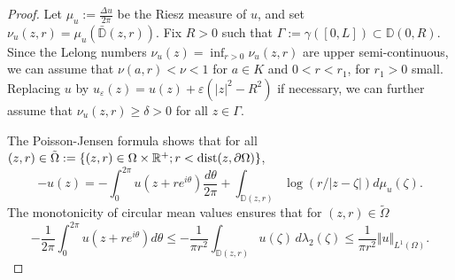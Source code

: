 \documentclass[a4paper,11pt,leqno,english]{smfart}
\theoremstyle{plain}
\theoremstyle{plain}
\numberwithin{equation}{section} %
\numberwithin{figure}{section} %
\theoremstyle{plain}
\theoremstyle{plain}
\theoremstyle{remark}
\theoremstyle{remark}
\theoremstyle{definition}
\theoremstyle{plain}
\theoremstyle{plain}
\theoremstyle{definition}
\newcommand{\R}{{\mathbb{R}}}
\newcommand{\e}{\varepsilon}
\begin{document}
 \begin{proof} 
Let $ \mu_u := \frac{\Delta u }{2 \pi}  $ be the Riesz measure of $u$, and set $\nu_u(z,r) =  \mu_u(\bar{{\mathbb D }} (z,r))$.
Fix $R > 0$ such that $\Gamma:=\gamma([0,L]) \subset {\mathbb D } (0,R)$.
Since the Lelong numbers $\nu_u(z)=\inf_{r>0} \nu_u(z,r)$ are upper semi-continuous,
 we can assume that  $\nu (a,r) < \nu <1$ for $a \in K$ and $0< r <  r_1$, for $r_1 >0$ small.
  Replacing $u$ by  $u_{\e} (z)= u (z) + \e (\vert z\vert^2 - R^2)$
 if necessary, we can further assume that $ \nu_u(z,r)  \geq \delta > 0$ for all $z \in \Gamma$.

 The  Poisson-Jensen formula \cite[Proposition 1.25]{GZbook} shows  that for all 
 $(z,r) \in \Tilde \Omega:= \{(z,r) \in \Omega \times \R^+ ;  r < \text{dist}(z,\partial \Omega)\}$,
 $$
   -  u (z) =  -\int_0^{2 \pi} u (z+r e^{i \theta}) \frac{d \theta}{2 \pi}+
 \int_{{\mathbb D }(z,r)} \log (r\slash \vert z - \zeta\vert)  d\mu_u(\zeta).
$$
The monotonicity of circular mean values ensures that for $(z,r) \in \tilde \Omega$ 
 $$
    - \frac{1}{2 \pi} \int_0^{2 \pi} u (z+r e^{i \theta}) d \theta 
  \leq  - \frac{1}{\pi r^2} \int_{{\mathbb D }(z,r)}  u (\zeta) \, d \lambda_2 (\zeta)  
  \leq \frac{1}{\pi r^2} \Vert u\Vert_{L^1(\Omega)}.
$$
 

\end{proof}
\end{document}
